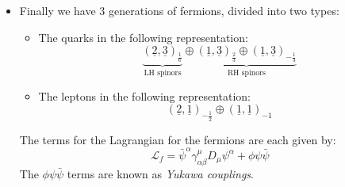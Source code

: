 \documentclass{jknotes}
\begin{document}
\begin{itemize}
\begin{figure}[H]
        \end{figure}
    \item Finally we have 3 generations of fermions, divided into two types:
        \begin{itemize}
            \item The quarks in the following representation:
                \begin{equation}
                    \underbrace{(\underline{2},\underline{3})_{\frac{1}{6}}}_\text{LH spinors} \oplus \underbrace{(\underline{1},\underline{3})_\frac{2}{3} \oplus (\underline{1},\underline{3})_{-\frac{1}{3}}}_\text{RH spinors}
                \end{equation}
            \item The leptons in the following representation:
                \begin{equation}
                    (\underline{2},\underline{1})_{-\frac{1}{2}} \oplus (\underline{1},\underline{1})_{-1}
                \end{equation}
        \end{itemize}
        The terms for the Lagrangian for the fermions are each given by:
        \begin{equation}
            \mathcal{L}_f = \bar{\psi}^\alpha \gamma^\mu_{\alpha\beta}D_\mu\psi^\alpha + \phi \psi\bar{\psi}
        \end{equation}
        The \(\phi\psi\bar{\psi}\) terms are known as \emph{Yukawa couplings}.
\end{itemize}
\end{document}
